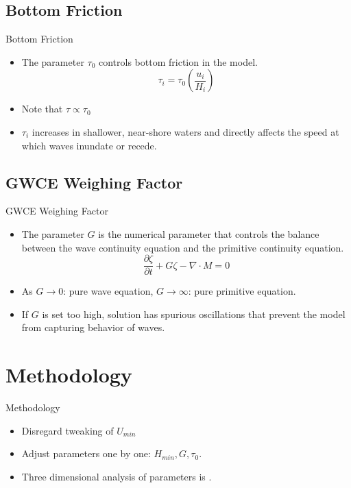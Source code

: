 \documentclass[10pt]{beamer}
\begin{document}
\subsection{Bottom Friction}
\begin{frame}{Bottom Friction}{}
	\begin{itemize}
		\item<1-> The parameter $\tau_0$ controls bottom friction in the model.
		\begin{equation*}
		\tau_i = \tau_0 \left(\frac{u_i}{H_i}\right)
		\end{equation*}
		\item<2-> Note that $\tau \propto \tau_0$
		\item<2-> $\tau_i$ increases in shallower, near-shore waters and directly affects the speed at which waves inundate or recede.
	\end{itemize}
\end{frame}

\subsection{GWCE Weighing Factor}
\begin{frame}{GWCE Weighing Factor}
	\begin{itemize}
		\item<1-> The parameter $G$ is the numerical parameter that controls the balance between the wave continuity equation and the primitive continuity equation.
		\begin{equation*}
			\frac{\partial \zeta}{\partial t} + G\zeta - \nabla \cdot M = 0
		\end{equation*}
		\item<1-> As $G \rightarrow 0$: pure wave equation, $G \rightarrow \infty$: pure primitive equation.
		\item<2-> If $G$ is set too high, solution has spurious oscillations that prevent the model from capturing behavior of waves.
	\end{itemize}
\end{frame}

\section{Methodology}
\begin{frame}{Methodology}
	\begin{itemize}
		\item<1-> Disregard tweaking of $U_{min}$
		\item<2-> Adjust parameters one by one: $H_{min}, G, \tau_0$.
		\item<3-> Three dimensional analysis of parameters is .
	\end{itemize}
\end{frame}
\end{document}
